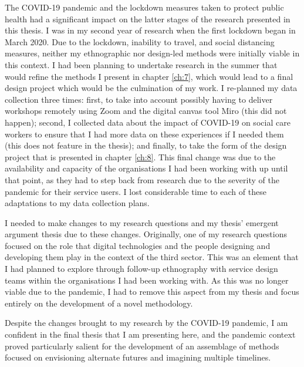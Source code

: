 \begin{covid}
The COVID-19 pandemic and the lockdown measures taken to protect public health had a significant impact on the latter stages of the research presented in this thesis. I was in my second year of research when the first lockdown began in March 2020. Due to the lockdown, inability to travel, and social distancing measures, neither my ethnographic nor design-led methods were initially viable in this context. I had been planning to undertake research in the summer that would refine the methods I present in chapter \ref{ch:7}, which would lead to a final design project which would be the culmination of my work. I re-planned my data collection three times: first, to take into account possibly having to deliver workshops remotely using Zoom and the digital canvas tool Miro (this did not happen); second, I collected data about the impact of COVID-19 on social care workers to ensure that I had more data on these experiences if I needed them (this does not feature in the thesis); and finally, to take the form of the design project that is presented in chapter \ref{ch:8}. This final change was due to the availability and capacity of the organisations I had been working with up until that point, as they had to step back from research due to the severity of the pandemic for their service users. I lost considerable time to each of these adaptations to my data collection plans. 

I needed to make changes to my research questions and my thesis' emergent argument thesis due to these changes. Originally, one of my research questions focused on the role that digital technologies and the people designing and developing them play in the context of the third sector. This was an element that I had planned to explore through follow-up ethnography with service design teams within the organisations I had been working with. As this was no longer viable due to the pandemic, I had to remove this aspect from my thesis and focus entirely on the development of a novel methodology.

Despite the changes brought to my research by the COVID-19 pandemic, I am confident in the final thesis that I am presenting here, and the pandemic context proved particularly salient for the development of an assemblage of methods focused on envisioning alternate futures and imagining multiple timelines. 
\end{covid}